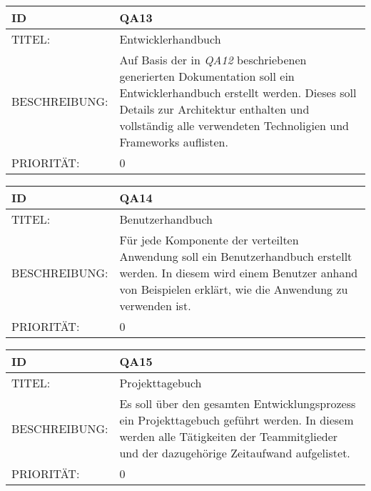 \begin{tabularx}{16cm}{l|X}
	 \textbf{ID} & \textbf{QA13} \\
	 \hline
		TITEL: & Entwicklerhandbuch\\ 
	 \hline 
		BESCHREIBUNG: & Auf Basis der in \textit{QA12} beschriebenen generierten Dokumentation soll ein Entwicklerhandbuch erstellt werden. Dieses soll Details zur Architektur enthalten und vollständig alle verwendeten Technoligien und Frameworks auflisten.\\
		\hline
		PRIORITÄT: & 0\\
\end{tabularx} 


\begin{tabularx}{16cm}{l|X}
	 \textbf{ID} & \textbf{QA14} \\
	 \hline
		TITEL: & Benutzerhandbuch\\ 
	 \hline 
	 BESCHREIBUNG: & Für jede Komponente der verteilten Anwendung soll ein Benutzerhandbuch erstellt werden. In diesem wird einem Benutzer anhand von Beispielen erklärt, wie die Anwendung zu verwenden ist. \\
	 \hline 
	 PRIORITÄT: & 0\\
\end{tabularx} 


\begin{tabularx}{16cm}{l|X}
	 \textbf{ID} & \textbf{QA15} \\
	 \hline
		TITEL: & Projekttagebuch\\ 
	 \hline 
	 BESCHREIBUNG: & Es soll über den gesamten Entwicklungsprozess ein Projekttagebuch geführt werden. In diesem werden alle Tätigkeiten der Teammitglieder und der dazugehörige Zeitaufwand aufgelistet. \\
	 \hline
	 PRIORITÄT: & 0\\
\end{tabularx} 
